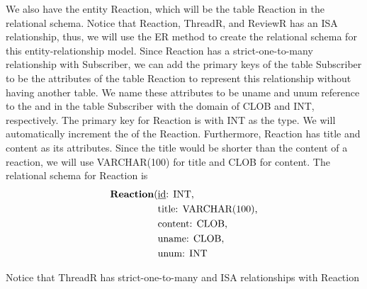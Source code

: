 \documentclass{article}
\newcommand{\key}[1]{\underline{\smash{#1}}}
\begin{document}
We also have the entity Reaction, which will be the table Reaction in the
relational schema. Notice that Reaction, ThreadR, and ReviewR has an ISA
relationship, thus, we will use the ER method to create the relational schema
for this entity-relationship model. Since Reaction has a strict-one-to-many
relationship with Subscriber, we can add the primary keys of the table
Subscriber to be the attributes of the table Reaction to represent this
relationship without having another table. We name these attributes to be uname
and unum reference to the \key{username} and \key{number} in the table
Subscriber with the domain of CLOB and INT, respectively. The primary key for
Reaction is \key{id} with INT as the type. We will automatically increment the
\key{id} of the Reaction. Furthermore, Reaction has title and content as its
attributes. Since the title would be shorter than the content of a reaction, we
will use VARCHAR(100) for title and CLOB for content. The relational schema for
Reaction is
\begin{align*}
    \text{\textbf{Reaction}(} & \text{\key{id}: INT,} \\
                              & \text{title: VARCHAR(100),} \\
                              & \text{content: CLOB,} \\
                              & \text{uname: CLOB,} \\
                              & \text{unum: INT} 
\end{align*}

Notice that ThreadR has strict-one-to-many and ISA relationships with Reaction
\end{document}
